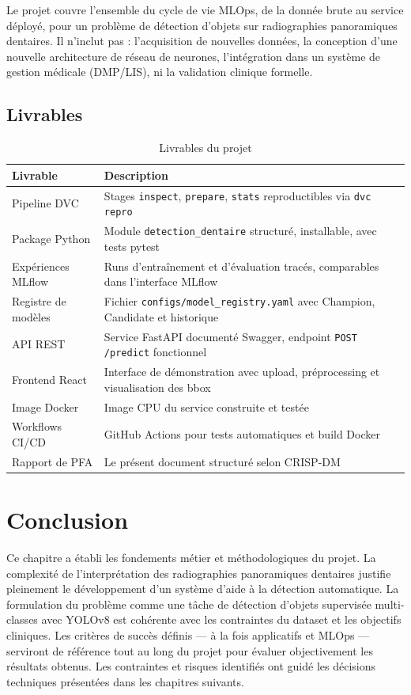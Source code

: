 \documentclass{rapportENSIAS}
\begin{document}
Le projet couvre l'ensemble du cycle de vie MLOps, de la donnée brute au service déployé, pour un problème de détection d'objets sur radiographies panoramiques dentaires. Il n'inclut pas : l'acquisition de nouvelles données, la conception d'une nouvelle architecture de réseau de neurones, l'intégration dans un système de gestion médicale (DMP/LIS), ni la validation clinique formelle.

\subsection{Livrables}

\begin{table}[H]
\centering
\caption{Livrables du projet}
\label{tab:livrables}
\begin{tabular}{p{4cm} p{10cm}}
\toprule
\textbf{Livrable} & \textbf{Description} \\
\midrule
Pipeline DVC & Stages \texttt{inspect}, \texttt{prepare}, \texttt{stats} reproductibles via \texttt{dvc repro} \\
Package Python & Module \texttt{detection\_dentaire} structuré, installable, avec tests pytest \\
Expériences MLflow & Runs d'entraînement et d'évaluation tracés, comparables dans l'interface MLflow \\
Registre de modèles & Fichier \texttt{configs/model\_registry.yaml} avec Champion, Candidate et historique \\
API REST & Service FastAPI documenté Swagger, endpoint \texttt{POST /predict} fonctionnel \\
Frontend React & Interface de démonstration avec upload, préprocessing et visualisation des bbox \\
Image Docker & Image CPU du service construite et testée \\
Workflows CI/CD & GitHub Actions pour tests automatiques et build Docker \\
Rapport de PFA & Le présent document structuré selon CRISP-DM \\
\bottomrule
\end{tabular}
\end{table}

\section{Conclusion}

Ce chapitre a établi les fondements métier et méthodologiques du projet. La complexité de l'interprétation des radiographies panoramiques dentaires justifie pleinement le développement d'un système d'aide à la détection automatique. La formulation du problème comme une tâche de détection d'objets supervisée multi-classes avec YOLOv8 est cohérente avec les contraintes du dataset et les objectifs cliniques. Les critères de succès définis — à la fois applicatifs et MLOps — serviront de référence tout au long du projet pour évaluer objectivement les résultats obtenus. Les contraintes et risques identifiés ont guidé les décisions techniques présentées dans les chapitres suivants.
\end{document}
